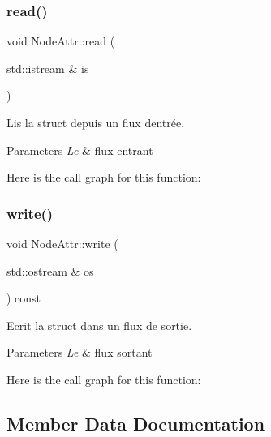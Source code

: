 \subsubsection{\texorpdfstring{read()}{read()}}
{\footnotesize\ttfamily void Node\+Attr\+::read (\begin{DoxyParamCaption}\item[{std\+::istream \&}]{is }\end{DoxyParamCaption})\hspace{0.3cm}{\ttfamily [inline]}}



Lis la struct depuis un flux d\textquotesingle{}entrée. 


\begin{DoxyParams}{Parameters}
{\em Le} & flux entrant \\
\hline
\end{DoxyParams}
Here is the call graph for this function\+:
\mbox{\label{struct_node_attr_a689f2d11e05d5cbf82f8b4ddff2dc658}} 
\subsubsection{\texorpdfstring{write()}{write()}}
{\footnotesize\ttfamily void Node\+Attr\+::write (\begin{DoxyParamCaption}\item[{std\+::ostream \&}]{os }\end{DoxyParamCaption}) const\hspace{0.3cm}{\ttfamily [inline]}}



Ecrit la struct dans un flux de sortie. 


\begin{DoxyParams}{Parameters}
{\em Le} & flux sortant \\
\hline
\end{DoxyParams}
Here is the call graph for this function\+:


\subsection{Member Data Documentation}
\mbox{\label{struct_node_attr_a9bd12eee0adc8d7a8686d425d749ada8}} 
